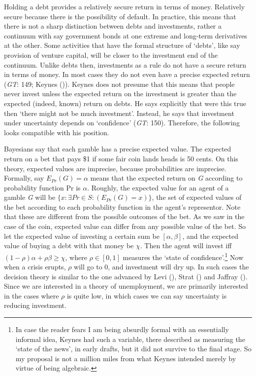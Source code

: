 \documentclass[
  10pt,
  letterpaper,
  DIV=11,
  numbers=noendperiod,
  twoside]{scrartcl}
\begin{document}
Holding a debt provides a relatively secure return in terms of money.
Relatively secure because there is the possibility of default. In
practice, this means that there is not a sharp distinction between debts
and investments, rather a continuum with say government bonds at one
extreme and long-term derivatives at the other. Some activities that
have the formal structure of `debts', like say provision of venture
capital, will be closer to the investment end of the continuum. Unlike
debts then, investments as a rule do not have a secure return in terms
of money. In most cases they do not even have a precise expected return
(\emph{GT}: 149; Keynes ()). Keynes
does not presume that this means that people never invest unless the
expected return on the investment is greater than the expected (indeed,
known) return on debts. He says explicitly that were this true then
`there might not be much investment'. Instead, he says that investment
under uncertainty depends on `confidence' (\emph{GT}: 150). Therefore,
the following looks compatible with his position.

Bayesians say that each gamble has a precise expected value. The
expected return on a bet that pays \$1 if some fair coin lands heads is
50 cents. On this theory, expected values are imprecise, because
probabilities are imprecise. Formally, say \(E_{Pr}(G) = \alpha\) means
that the expected return on \emph{G} according to probability function
Pr is \(\alpha\). Roughly, the expected value for an agent of a gamble
\emph{G} will be \(\{x: \exists Pr \in S: (E_{Pr}(G) = x)\}\), the set
of expected values of the bet according to each probability function in
the agent's representor. Note that these are different from the possible
outcomes of the bet. As we saw in the case of the coin, expected value
can differ from any possible value of the bet. So let the expected value
of investing a certain sum be \([\alpha, \beta]\), and the expected
value of buying a debt with that money be \(\chi\). Then the agent will
invest iff \((1 - \rho)\alpha + \rho \beta \geq \chi\), where
\(\rho \in [0, 1]\) measures the `state of confidence'.\footnote{In case
  the reader fears I am being absurdly formal with an essentially
  informal idea, Keynes had such a variable, there described as
  measuring the `state of the news', in early drafts, but it did not
  survive to the final stage. So my proposal is not a million miles from
  what Keynes intended merely by virtue of being algebraic.} Now when a
crisis erupts, \(\rho\) will go to 0, and investment will dry up. In
such cases the decision theory is similar to the one advanced by Levi
(), Strat ()
and Jaffray (). Since we are interested
in a theory of unemployment, we are primarily interested in the cases
where \(\rho\) is quite low, in which cases we can say uncertainty is
reducing investment.
\end{document}
